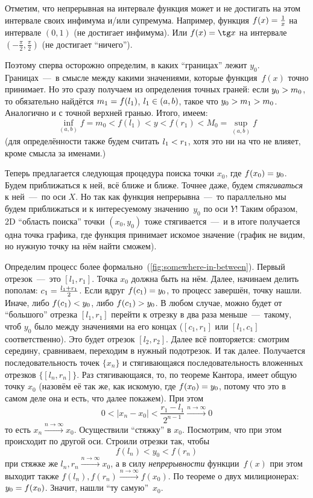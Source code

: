 \documentclass[a4paper,12pt]{article}
\begin{document}
  \begin{solution}
    Отметим, что непрерывная на интервале функция может и не достигать на этом интервале своих инфимума и/или супремума.
    Например, функция $f(x) \hm= \frac{1}{x}$ на интервале $(0, 1)$ (не достигает инфимума).
    Или $f(x) \hm= \tg x$ на интервале $\left(-\frac{\pi}{2}, \frac{\pi}{2}\right)$ (не достигает ``ничего'').

    Поэтому сперва осторожно определим, в каких ``границах'' лежит $y_0$.
    Границах~---~в смысле между какими значениями, которые функция~$f(x)$ точно принимает.
    Но это сразу получаем из определения точных граней: если $y_0 \hm> m_0$, то обязательно найдётся $m_1 \hm= f(l_1)$, $l_1 \hm\in (a, b)$, такое что $y_0 \hm> m_1 \hm> m_0$.
    Аналогично и с точной верхней гранью.
    Итого, имеем:
    \[
      \inf_{(a, b)} f = m_0 < f(l_1) < y < f(r_1) < M_0 = \sup_{(a, b)} f
    \]
    (для определённости также будем считать $l_1 \hm< r_1$, хотя это ни на что не влияет, кроме смысла за именами.)

    Теперь предлагается следующая процедура поиска точки $x_0$, где $f(x_0) \hm= y_0$.
    Будем приближаться к ней, всё ближе и ближе.
    Точнее даже, будем \emph{стягиваться} к ней~---~по оси $X$.
    Но так как функция непрерывна~---~то параллельно мы будем приближаться и к интересуемому значению~$y_0$ по оси $Y$!
    Таким образом, 2D ``область поиска'' точки $(x_0, y_0)$ тоже стягивается~---~и в итоге получается одна точка графика, где функция принимает искомое значение (график не видим, но нужную точку на нём найти сможем).

    Определим процесс более формально~(\ref{fig:somewhere-in-between}).
    Первый отрезок~---~это $[l_1, r_1]$.
    Точка $x_0$ должна быть на нём.
    Далее, начинаем делить пополам: $c_1 \hm= \frac{l_1 + r_1}{2}$.
    Если вдруг $f(c_1) \hm= y_0$, то процесс завершён, точку нашли.
    Иначе, либо $f(c_1) \hm< y_0$, либо $f(c_1) \hm> y_0$.
    В любом случае, можно будет от ``большого'' отрезка $[l_1, r_1]$ перейти к отрезку в два раза меньше~---~такому, чтоб $y_0$ было между значениями на его концах ($[c_1, r_1]$ или $[l_1, c_1]$ соответственно).
    Это будет отрезок $[l_2, r_2]$.
    Далее всё повторяется: смотрим середину, сравниваем, переходим в нужный подотрезок.
    И так далее.
    Получается последовательность точек $\{x_n\}$ и стягивающаяся последовательность вложенных отрезков $\{[l_n, r_n]\}$.
    Раз стягивающаяся, то, по теореме Кантора, имеет общую точку $x_0$ (назовём её так же, как искомую, где $f(x_0) \hm= y_0$, потому что это в самом деле она и есть, что далее покажем).
    При этом
    \[
      0 < |x_n - x_0| < \frac{r_1 - l_1}{2^{n - 1}} \xrightarrow{n \to \infty} 0
    \]
    то есть $x_n \xrightarrow{n \to \infty} x_0$.
    Осуществили ``стяжку'' в $x_0$.
    Посмотрим, что при этом происходит по другой оси.
    Строили отрезки так, чтобы
    \[
      f(l_n) < y_0 < f(r_n)
    \]
    при стяжке же $l_n, r_n \xrightarrow{n \to \infty} x_0$, а в силу \emph{непрерывности} функции~$f(x)$ при этом выходит также $f(l_n), f(r_n) \xrightarrow{n \to \infty} f(x_0)$.
    По теореме о двух милиционерах: $y_0 \hm= f(x_0)$.
    Значит, нашли ``ту самую''~$x_0$.
    

\end{solution}
\end{document}
